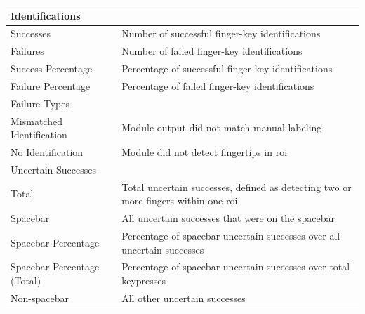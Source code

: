 \documentclass{report}
\begin{document}
\begin{table}[H]
	\small
	\centering
	\begin{tabular}{ p{} p{} }
		\toprule
		Identifications                                                                                                                    \\
		\midrule
		Successes                                & Number of successful finger-key identifications                                         \\
		Failures                                 & Number of failed finger-key identifications                                             \\
		Success Percentage                       & Percentage of successful finger-key identifications                                     \\
		Failure Percentage                       & Percentage of failed finger-key identifications
		\\[0.25cm]
		\midrule
		Failure Types                                                                                                                      \\
		\midrule
		Mismatched Identification                & Module output did not match manual labeling                                             \\
		No Identification                        & Module did not detect fingertips in \ac{roi}
		\\[0.25cm]
		\midrule
		Uncertain Successes                                                                                                                \\
		\midrule
		Total                                    & Total uncertain successes, defined as detecting two or more fingers within one \ac{roi} \\
		Spacebar                                 & All uncertain successes that were on the spacebar                                       \\
		Spacebar Percentage                      & Percentage of spacebar uncertain successes over all uncertain successes                 \\
		Spacebar Percentage (Total)              & Percentage of spacebar uncertain successes over total keypresses                        \\
		Non-spacebar                             & All other uncertain successes                                                           \\

\end{tabular}
\end{table}
\end{document}
